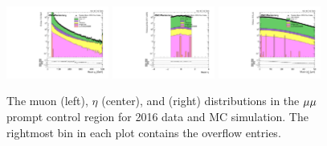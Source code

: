 \begin{figure}
\centering
\includegraphics[width=0.3\textwidth]{figures/selection/pcr_mumu_2016/muonPt.pdf}
\includegraphics[width=0.3\textwidth]{figures/selection/pcr_mumu_2016/muonEta.pdf}
\includegraphics[width=0.3\textwidth]{figures/selection/pcr_mumu_2016/muonAbsD0_50um.pdf}
\caption{The muon \pt (left), $\eta$ (center), and \ad (right) distributions in the ${\mu}{\mu}$ prompt control region for 2016 data and MC simulation. The rightmost bin in each plot
contains the overflow entries.}
\label{pcr_mumu_2016}
\end{figure}
